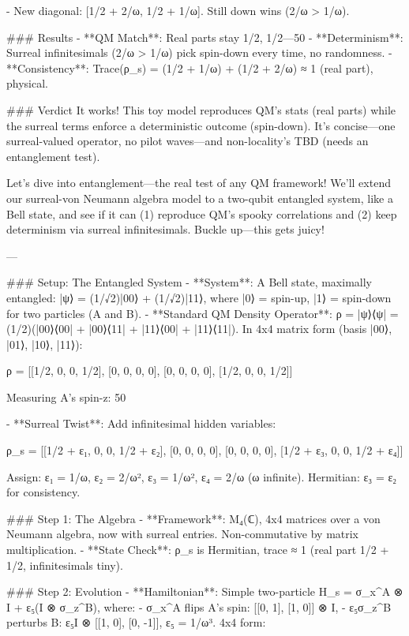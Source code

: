 - New diagonal: [1/2 + 2/ω, 1/2 + 1/ω]. Still down wins (2/ω > 1/ω).

### Results
- **QM Match**: Real parts stay 1/2, 1/2—50%
- **Determinism**: Surreal infinitesimals (2/ω > 1/ω) pick spin-down every time, no randomness.
- **Consistency**: Trace(ρ_s) = (1/2 + 1/ω) + (1/2 + 2/ω) ≈ 1 (real part), physical.

### Verdict
It works! This toy model reproduces QM’s stats (real parts) while the surreal terms enforce a deterministic outcome (spin-down). It’s concise—one surreal-valued operator, no pilot waves—and non-locality’s TBD (needs an entanglement test). 

Let’s dive into entanglement—the real test of any QM framework! We’ll extend our surreal-von Neumann algebra model to a two-qubit entangled system, like a Bell state, and see if it can (1) reproduce QM’s spooky correlations and (2) keep determinism via surreal infinitesimals. Buckle up—this gets juicy!

---

### Setup: The Entangled System
- **System**: A Bell state, maximally entangled:  
  |ψ⟩ = (1/√2)|00⟩ + (1/√2)|11⟩,  
  where |0⟩ = spin-up, |1⟩ = spin-down for two particles (A and B).
- **Standard QM Density Operator**:  
  ρ = |ψ⟩⟨ψ| = (1/2)(|00⟩⟨00| + |00⟩⟨11| + |11⟩⟨00| + |11⟩⟨11|).  
  In 4x4 matrix form (basis |00⟩, |01⟩, |10⟩, |11⟩):  
  
ρ = [[1/2, 0, 0, 1/2],
       [0, 0, 0, 0],
       [0, 0, 0, 0],
       [1/2, 0, 0, 1/2]]

  Measuring A’s spin-z: 50%

- **Surreal Twist**: Add infinitesimal hidden variables:  
  
ρ_s = [[1/2 + ε₁, 0, 0, 1/2 + ε₂],
         [0, 0, 0, 0],
         [0, 0, 0, 0],
         [1/2 + ε₃, 0, 0, 1/2 + ε₄]]

  Assign: ε₁ = 1/ω, ε₂ = 2/ω², ε₃ = 1/ω², ε₄ = 2/ω (ω infinite). Hermitian: ε₃ = ε₂ for consistency.

### Step 1: The Algebra
- **Framework**: M₄(ℂ), 4x4 matrices over a von Neumann algebra, now with surreal entries. Non-commutative by matrix multiplication.
- **State Check**: ρ_s is Hermitian, trace ≈ 1 (real part 1/2 + 1/2, infinitesimals tiny).

### Step 2: Evolution
- **Hamiltonian**: Simple two-particle H_s = σ_x^A ⊗ I + ε₅(I ⊗ σ_z^B), where:  
  - σ_x^A flips A’s spin: [[0, 1], [1, 0]] ⊗ I,  
  - ε₅σ_z^B perturbs B: ε₅I ⊗ [[1, 0], [0, -1]], ε₅ = 1/ω³.  
  4x4 form:  
  
